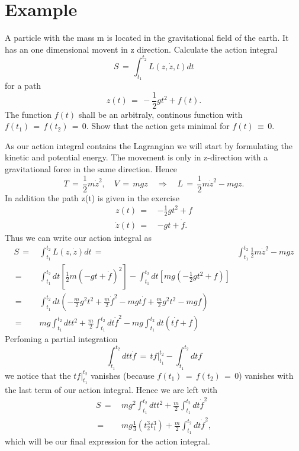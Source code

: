 \section{Example}
A particle with the mass m is located in the gravitational field of the earth.
It has an one dimensional movent in z direction. Calculate the action integral
\begin{equation}
  S \,=\, \int_{t_1}^{t_2} L(z, \dot z, t) dt
\end{equation}
for a path 
\begin{equation}
  z(t) \,=\, - \frac{1}{2} gt^2 + f(t).
\end{equation}
The function $f(t)$ shall be an arbitraly, continous function with $f(t_1)
\,=\, f(t_2) \,=\, 0$. Show that the action gets minimal for $f(t) \,\equiv\, 0$.

As our action integral contains the Lagrangian we will start by formulating the
kinetic and potential energy. The movement is only in z-direction with a
gravitational force in the same direction. Hence 
\begin{equation*}
  T \,=\, \frac{1}{2} m \dot z^2, \quad V \,=\, mgz \quad \Rightarrow \quad L
\,=\, \frac{1}{2} m \dot z^2 - mgz.
\end{equation*}
In addition the path z(t) is given in the exercise
\begin{align*}
  z(t) \,=\,& -\frac{1}{2} gt^2 + f \\
  \dot z(t) \,=\,& -gt + \dot f.
\end{align*}
Thus we can write our action integral as
\begin{equation*}
  \begin{aligned}
    S \,=\,& \int_{t_1}^{t_2} L(z, \dot z) dt
    \,=\,& \int_{t_1}^{t_2} \frac{1}{2} m \dot z^2 - mgz \\
    \,=\,& \int_{t_1}^{t_2} dt [ \frac{1}{2} m (-gt + \dot f)^2] - \int_{t_1}^{t_2}
dt [mg (-\frac{1}{2}
gt^2 + f)] \\
    \,=\,& \int_{t_1}^{t_2} dt (- \frac{m}{2} g^2 t^2 + \frac{m}{2} \dot f^2 -
m g t \dot f + \frac{m}{2} g^2 t^2 - mgf) \\
    \,=\,& mg \int_{t_1}^{t_2} dt t^2 + \frac{m}{2} \int_{t_1}^{t_2} dt \dot
f^2 - mg \int_{t_1}^{t_2} dt (t \dot f + f) 
  \end{aligned}
\end{equation*}
Perfoming a partial integration 
\begin{equation*}
  \int_{t_1}^{t_2} dt t \dot f \,=\, t f |_{t_1}^{t_2} - \int_{t_1}^{t_2} dt f
\end{equation*}
we notice that the $tf |_{t_1}^{t_2}$ vanishes (because $f(t_1) \,=\, f(t_2)
\,=\, 0$) vanishes with the last term of our action integral. Hence we are left
with
\begin{equation*}
  \begin{aligned}
    S \,=\,& mg^2 \int_{t_1}^{t_2} dt t^2 + \frac{m}{2} \int_{t_1}^{t_2} dt
\dot f^2 \\
    \,=\,& mg \frac{1}{3} (t_2^3 t_1^3) + \frac{m}{2} \int_{t_1}^{t_2} dt \dot
f^2,
  \end{aligned}
\end{equation*}
which will be our final expression for the action integral.

